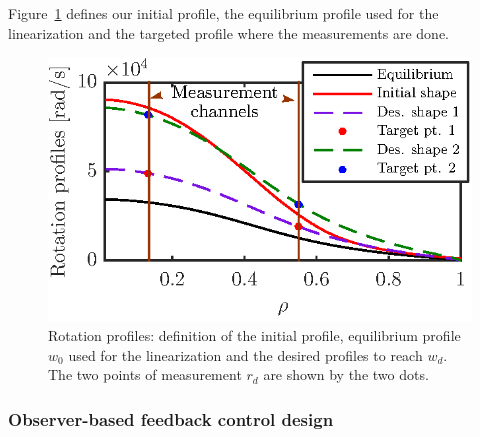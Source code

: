 \documentclass{iopart}
\begin{document}
Figure~\ref{fig:rot11} defines our initial profile, the equilibrium profile used for the linearization and the targeted profile where the measurements are done.
\begin{figure}
	\centering
\includegraphics{imene_figs/fig11} %
\caption{Rotation profiles: definition of the initial profile, equilibrium profile $w_0$ used for the linearization and the desired profiles to reach $w_d$. The two points of measurement $r_d$ are shown by the two dots.}
\label{fig:rot11}
\end{figure}




\subsubsection{Observer-based feedback control design} 
\end{document}
